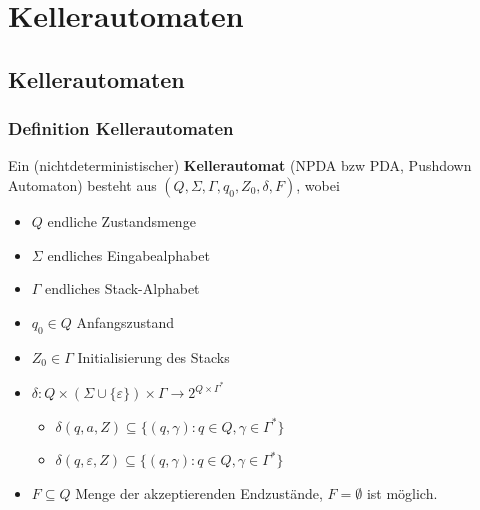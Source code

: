 \section{Kellerautomaten}
\subsection{Kellerautomaten}
\begin{frame}
	\frametitle{Definition Kellerautomaten}
	Ein (nichtdeterministischer) \textbf{Kellerautomat} (NPDA bzw PDA, Pushdown Automaton) besteht aus $(Q, \Sigma, \Gamma, q_0, Z_0,\delta, F)$, wobei
	\begin{itemize}
		\item $Q$ endliche Zustandsmenge
		\item $\Sigma$ endliches Eingabealphabet
		\item $\Gamma$ endliches Stack-Alphabet
		\item $q_0 \in Q$ Anfangszustand
		\item $Z_0 \in \Gamma$ Initialisierung des Stacks
		\item $\delta : Q \times ( \Sigma \cup \{\varepsilon\}) \times \Gamma \rightarrow 2^{Q \times \Gamma^*}$
		\begin{itemize}
			\item $\delta(q, a, Z) \subseteq \{(q,\gamma) : q \in Q, \gamma \in \Gamma^*\}$
			\item $\delta(q, \varepsilon, Z) \subseteq \{(q,\gamma) : q \in Q, \gamma \in \Gamma^*\}$
		\end{itemize}
		\item $F \subseteq Q$ Menge der akzeptierenden Endzustände, $F=\emptyset$ ist möglich.
		
		\vspace{-4cm}
	\end{itemize}
\end{frame}

